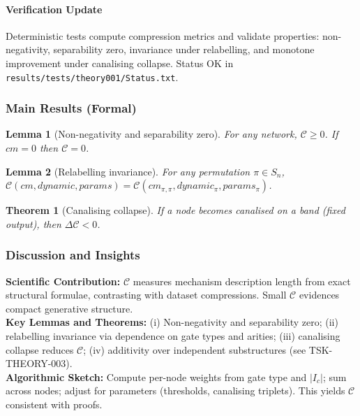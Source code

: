 \documentclass[11pt]{article}
\newtheorem{theorem}{Theorem}
\newtheorem{lemma}{Lemma}
\begin{document}
\paragraph{Verification Update} Deterministic tests compute compression metrics and validate properties: non-negativity, separability zero, invariance under relabelling, and monotone improvement under canalising collapse. Status OK in \texttt{results/tests/theory001/Status.txt}.
\subsubsection*{Main Results (Formal)}
\begin{lemma}[Non-negativity and separability zero]
For any network, \(\mathcal{C}\ge 0\). If \(cm=0\) then \(\mathcal{C}=0\).
\end{lemma}
\begin{lemma}[Relabelling invariance]
For any permutation \(\pi\in S_n\), \(\mathcal{C}(cm, dynamic, params)=\mathcal{C}(cm_{\pi,\pi}, dynamic_{\pi}, params_{\pi})\).
\end{lemma}
\begin{theorem}[Canalising collapse]
If a node becomes canalised on a band (fixed output), then \(\Delta \mathcal{C}<0\).
\end{theorem}
\subsubsection*{Discussion and Insights}
\textbf{Scientific Contribution:} \(\mathcal{C}\) measures mechanism description length from exact structural formulae, contrasting with dataset compressions. Small \(\mathcal{C}\) evidences compact generative structure.\\
\textbf{Key Lemmas and Theorems:} (i) Non-negativity and separability zero; (ii) relabelling invariance via dependence on gate types and arities; (iii) canalising collapse reduces \(\mathcal{C}\); (iv) additivity over independent substructures (see TSK-\,THEORY-003).\\
\textbf{Algorithmic Sketch:} Compute per-node weights from gate type and \(\lvert I_c\rvert\); sum across nodes; adjust for parameters (thresholds, canalising triplets). This yields \(\mathcal{C}\) consistent with proofs.
\end{document}
